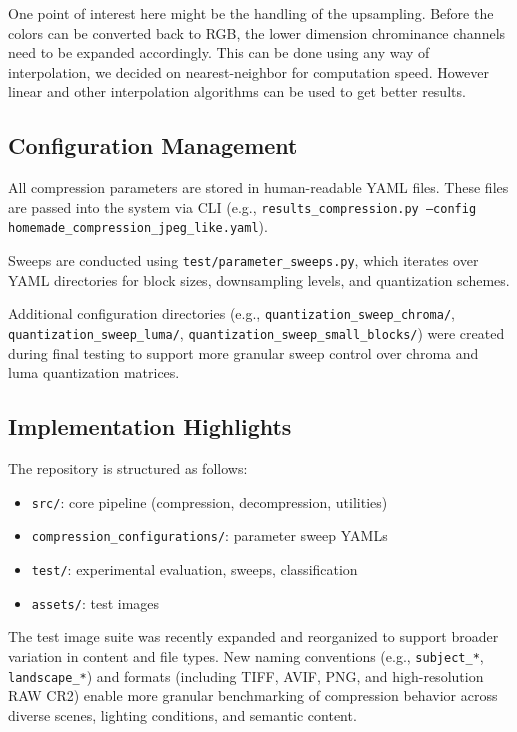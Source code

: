 One point of interest here might be the handling of the upsampling. Before the colors can be converted back to RGB, the lower dimension chrominance channels need to be expanded accordingly. This can be done using any way of interpolation, we decided on nearest-neighbor for computation speed. However linear and other interpolation algorithms can be used to get better results.
\subsection{Configuration Management}
\label{sec:config_management}
All compression parameters are stored in human-readable YAML files. These files are passed into the system via CLI (e.g., \texttt{results\_compression.py --config homemade\_compression\_jpeg\_like.yaml}).

Sweeps are conducted using \texttt{test/parameter\_sweeps.py}, which iterates over YAML directories for block sizes, downsampling levels, and quantization schemes.

Additional configuration directories (e.g., \texttt{quantization\_sweep\_chroma/}, \texttt{quantization\_sweep\_luma/}, \texttt{quantization\_sweep\_small\_blocks/}) were created during final testing to support more granular sweep control over chroma and luma quantization matrices.

\subsection{Implementation Highlights}

The repository is structured as follows:
\begin{itemize}
    \item \texttt{src/}: core pipeline (compression, decompression, utilities)
    \item \texttt{compression\_configurations/}: parameter sweep YAMLs
    \item \texttt{test/}: experimental evaluation, sweeps, classification
    \item \texttt{assets/}: test images
\end{itemize}

The test image suite was recently expanded and reorganized to support broader variation in content and file types. New naming conventions (e.g., \texttt{subject\_*}, \texttt{landscape\_*}) and formats (including TIFF, AVIF, PNG, and high-resolution RAW CR2) enable more granular benchmarking of compression behavior across diverse scenes, lighting conditions, and semantic content.

